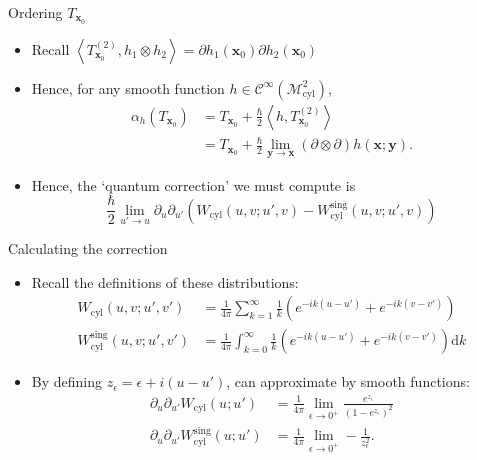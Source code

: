 \documentclass[pdf, fleqn, compress, handout]{beamer}
\begin{document}
\begin{frame}{Ordering $T_{\mathbf{x}_0}$}
	\begin{itemize}
		\item 	Recall
				$
					\left\langle
						T_{\mathbf{x}_0}^{(2)},
						h_1 \otimes h_2
					\right\rangle
						=
					\partial h_1(\mathbf{x}_0)
					\partial h_2(\mathbf{x}_0)
				$
		\item   Hence, for any smooth function
				$h \in \mathcal{C}^{\infty}(\mathcal{M}_\mathrm{cyl}^2)$,
				\begin{align}
					\alpha_h \left( T_{\mathbf{x}_0} \right)
					&	=
					T_{\mathbf{x}_0}
						+
					\frac{\hbar}{2}
					\left\langle 
						h,
						T_{\mathbf{x}_0}^{(2)}
					\right\rangle
					\nonumber \\
					&	=
					T_{\mathbf{x}_0}
						+
					\frac{\hbar}{2}
					\lim_{\mathbf{y} \to \mathbf{x}}
						\left( \partial \otimes \partial \right) h(\mathbf{x}; \mathbf{y}).
				\end{align}
		\item   Hence, the `quantum correction' we must compute is
				\begin{equation}
					\frac{\hbar}{2}
					\lim_{u' \to u}
					\partial_u \partial_{u'}
					\left(
						W_\mathrm{cyl}(u, v; u', v) -
						W_\mathrm{cyl}^\mathrm{sing}(u, v; u', v)
					\right)
				\end{equation}
	\end{itemize}
\end{frame}

\begin{frame}{Calculating the correction}
	\begin{itemize}
		\item	Recall the definitions of these distributions:
				\begin{align*}
					W_\mathrm{cyl}(u, v; u', v')
					&	=
					\frac{1}{4 \pi} \sum_{k = 1}^\infty
						\frac{1}{k} \left( 
							e^{-ik(u - u')} +
							e^{-ik(v - v')}
						 \right)
					\\
					W_\mathrm{cyl}^\mathrm{sing}(u, v; u', v')
					&	=
					\frac{1}{4 \pi} \int_{k = 0}^\infty
						\frac{1}{k} \left( 
							e^{-ik(u - u')} +
							e^{-ik(v - v')}
						 \right)
						\mathrm{d}k
				\end{align*}
		\item	By defining $z_\epsilon = \epsilon + i(u - u')$,
				can approximate by smooth functions:
				\begin{subequations}
					\begin{align}
						\label{eq:w_cyl_approx}
						\partial_u \partial_{u'}
						W_\mathrm{cyl}(u; u')
						&	=
						\frac{1}{4\pi}
						\lim_{\epsilon \to 0^+} \frac{e^{z_\epsilon}}{(1 - e^{z_\epsilon})^2}
							\\
						\partial_u \partial_{u'}
						W_\mathrm{cyl}^\mathrm{sing}(u; u')
						&	=
						\frac{1}{4\pi}
						\lim_{\epsilon \to 0^+}
							- \frac{1}{z_\epsilon^2}.
					\end{align}					
				\end{subequations}
	\end{itemize}
\end{frame}
\end{document}
